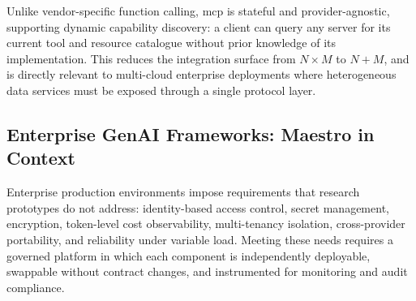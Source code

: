 Unlike vendor-specific function calling, \gls{mcp} is stateful and provider-agnostic, supporting dynamic capability discovery: a client can query any server for its current tool and resource catalogue without prior knowledge of its implementation. This reduces the integration surface from $N \times M$ to $N + M$, and is directly relevant to multi-cloud enterprise deployments where heterogeneous data services must be exposed through a single protocol layer.

\subsection{Enterprise GenAI Frameworks: Maestro in Context}
\label{sec:maestro}

Enterprise production environments impose requirements that research prototypes do not address: identity-based access control, secret management, encryption, token-level cost observability, multi-tenancy isolation, cross-provider portability, and reliability under variable load. Meeting these needs requires a governed platform in which each component is independently deployable, swappable without contract changes, and instrumented for monitoring and audit compliance.

